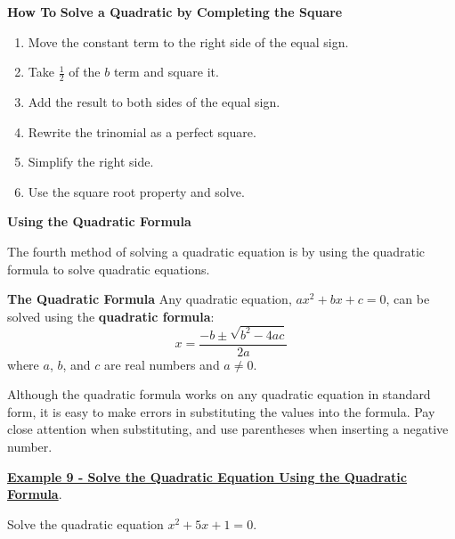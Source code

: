 \documentclass[12pt]{book}
\begin{document}
\begin{boxR}
    \textbf{How To}
    \vspace{1mm}
     \hline
    \vspace{2mm}
    \textbf{Solve a Quadratic by Completing the Square}

    \begin{enumerate}
        \item Move the constant term to the right side of the equal sign.
        \item Take $\frac{1}{2}$ of the $b$ term and square it. 
        \item Add the result to both sides of the equal sign. 
        \item Rewrite the trinomial as a perfect square. 
        \item Simplify the right side. 
        \item Use the square root property and solve.
    \end{enumerate}
\end{boxR}
\vspace{3mm}

{\large \textbf{Using the Quadratic Formula}}
\vspace{3mm}

The fourth method of solving a quadratic equation is by using the quadratic formula to solve quadratic equations. 

\vspace{3mm}
\begin{boxR}
    \textbf{The Quadratic Formula}
    \vspace{1mm}
    \hline
    \vspace{2mm}
    Any quadratic equation, $ax^2+bx+c=0$, can be solved using the \textbf{quadratic formula}:
    $$ x = \frac{-b \pm \sqrt{b^2-4ac}}{2a}$$
    where $a$, $b$, and $c$ are real numbers and $a\neq 0$.
    
\end{boxR}

Although the quadratic formula works on any quadratic equation in standard form, it is easy to make errors in substituting the values into the formula. Pay close attention when substituting, and use parentheses when inserting a negative number.
\vspace{3mm}

 \underline{\textbf{Example 9 - Solve the Quadratic Equation Using the Quadratic Formula}}.

Solve the quadratic equation $x^2+5x+1=0$.
\end{document}
